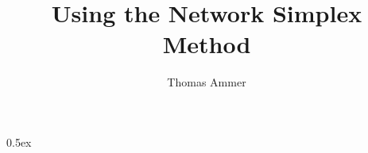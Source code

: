\documentclass[11pt,a4paper]{report}
\begin{document}
\title{Using the Network Simplex Method}
\author{Thomas Ammer}
\maketitle

\tableofcontents

\parindent 0pt\parskip 0.5ex



%
%
\end{document}

